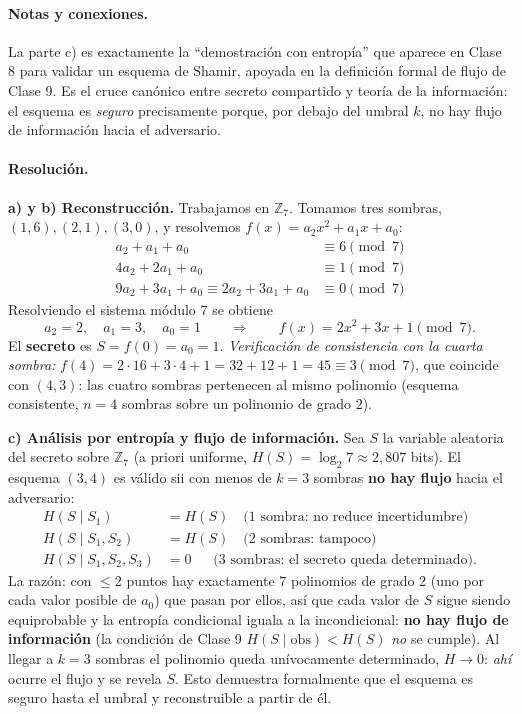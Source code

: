 \paragraph{Notas y conexiones.}
La parte c) es exactamente la ``demostración con entropía'' que aparece en Clase 8 para validar un esquema de Shamir, apoyada en la definición formal de flujo de Clase 9. Es el cruce canónico entre secreto compartido y teoría de la información: el esquema es \emph{seguro} precisamente porque, por debajo del umbral $k$, no hay flujo de información hacia el adversario.

\paragraph{Resolución.}
\textbf{a) y b) Reconstrucción.} Trabajamos en $\mathbb{Z}_7$. Tomamos tres sombras, $(1,6),(2,1),(3,0)$, y resolvemos $f(x)=a_2x^2+a_1x+a_0$:
\begin{align*}
  a_2 + a_1 + a_0 &\equiv 6 \pmod 7 \\
  4a_2 + 2a_1 + a_0 &\equiv 1 \pmod 7 \\
  9a_2 + 3a_1 + a_0 \equiv 2a_2 + 3a_1 + a_0 &\equiv 0 \pmod 7
\end{align*}
Resolviendo el sistema módulo $7$ se obtiene
\begin{equation*}
  a_2 = 2,\quad a_1 = 3,\quad a_0 = 1
  \qquad\Longrightarrow\qquad \boxed{f(x) = 2x^2 + 3x + 1 \pmod 7}.
\end{equation*}
El \textbf{secreto} es $S = f(0) = a_0 = \boxed{1}$. \emph{Verificación de consistencia con la cuarta sombra:} $f(4) = 2\cdot16 + 3\cdot4 + 1 = 32+12+1 = 45 \equiv 3 \pmod 7$, que coincide con $(4,3)$: las cuatro sombras pertenecen al mismo polinomio (esquema consistente, $n=4$ sombras sobre un polinomio de grado $2$).

\textbf{c) Análisis por entropía y flujo de información.} Sea $S$ la variable aleatoria del secreto sobre $\mathbb{Z}_7$ (a priori uniforme, $H(S)=\log_2 7 \approx 2{,}807$ bits). El esquema $(3,4)$ es válido sii con menos de $k=3$ sombras \textbf{no hay flujo} hacia el adversario:
\begin{align*}
  H(S \mid S_1) &= H(S) \quad\text{(1 sombra: no reduce incertidumbre)}\\
  H(S \mid S_1,S_2) &= H(S) \quad\text{(2 sombras: tampoco)}\\
  H(S \mid S_1,S_2,S_3) &= 0 \quad\;\;\text{(3 sombras: el secreto queda determinado)}.
\end{align*}
La razón: con $\le 2$ puntos hay exactamente $7$ polinomios de grado $2$ (uno por cada valor posible de $a_0$) que pasan por ellos, así que cada valor de $S$ sigue siendo equiprobable y la entropía condicional iguala a la incondicional: \textbf{no hay flujo de información} (la condición de Clase 9 $H(S\mid \text{obs}) < H(S)$ \emph{no} se cumple). Al llegar a $k=3$ sombras el polinomio queda unívocamente determinado, $H\to 0$: \emph{ahí} ocurre el flujo y se revela $S$. Esto demuestra formalmente que el esquema es seguro hasta el umbral y reconstruible a partir de él.

